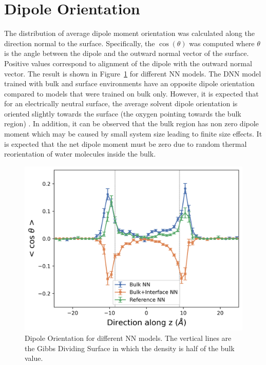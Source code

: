 \section{Dipole Orientation}
The distribution of average dipole moment orientation was calculated along the
direction
normal to the surface. Specifically, the $\cos(\theta)$ was computed where
$\theta$ is
the angle between the dipole and the outward normal vector of the surface.
Positive values correspond to alignment of the dipole with the outward normal
vector. The result is shown in Figure~\ref{fig:dipole_orient} for different NN
models. The DNN model trained with bulk and surface environments have an
opposite dipole
orientation compared to models that were trained on bulk only. However, it is
expected that for an electrically neutral surface, the average solvent dipole
orientation is oriented slightly towards the surface (the oxygen pointing
towards the
bulk region) \cite{WalkerGibbons2022,Kubincova2020}. In addition, it can be
observed that the bulk region has non zero dipole moment which may be caused by
small system size leading to finite size effects. It is expected that the net
dipole moment must be zero due to random thermal reorientation of water
molecules  inside the bulk.
\begin{figure}[tbhp!]
	\centering
	\includegraphics[width=0.75\linewidth]{images/dipole_dist_new.png}
	\caption{Dipole Orientation for different NN models. The vertical lines are
		the Gibbs Dividing Surface in which the density is half of the bulk value.
	}
	\label{fig:dipole_orient}
\end{figure}


\clearpage
